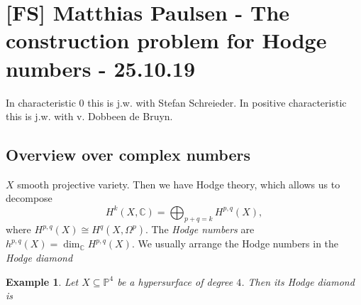\documentclass[12pt]{article}
\theoremstyle{darkgreentheorem}
\theoremstyle{darkbluedefinition}
\theoremstyle{darkredexample}
\newtheorem{exa}[thm]{Example}
\theoremstyle{remark}
\newcommand{\1}{\mathbbm{1}}
\newcommand{\C}{\mathbb{C}}
\renewcommand{\P}{\mathbb{P}}
\begin{document}
\section{[FS] Matthias Paulsen - The construction problem for Hodge numbers - 25.10.19}

In characteristic $0$ this is j.w. with Stefan Schreieder.
In positive characteristic this is j.w. with v. Dobbeen de Bruyn.

\subsection{Overview over complex numbers}

$X$ smooth projective variety.
Then we have Hodge theory, which allows us to decompose
\[ H^{k}(X,\C)=\bigoplus_{p+q=k}H^{p,q}(X), \]
where $H^{p,q}(X)\cong H^{q}(X,\Omega^{p})$.
The \textit{Hodge numbers} are $h^{p,q}(X)=\dim_{\C}H^{p,q}(X)$.
We usually arrange the Hodge numbers in the \textit{Hodge diamond}
\begin{center}
\end{center}

\begin{exa}
    Let $X\subseteq \P^{4}$ be a hypersurface of degree $4$.
    Then its Hodge diamond is
    \begin{center}
    \end{center}
\end{exa}
\end{document}
